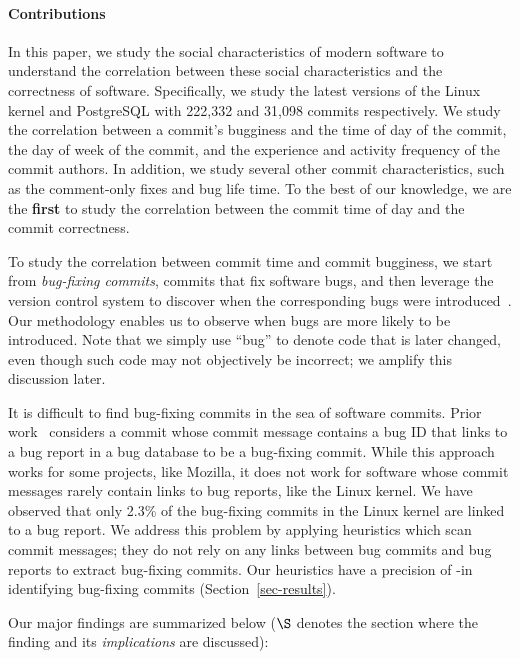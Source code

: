 \paragraph{Contributions}
In this paper, we study the social characteristics of modern software to understand 
the correlation between these social characteristics and the correctness of software.  
Specifically, we study the latest versions of the Linux kernel and PostgreSQL with 222,332 and 31,098 commits respectively.
We study the correlation between a commit's bugginess
and the time of day of the commit, the day of week of the commit, and
the experience and activity frequency of the commit authors.
%
In addition, we study several other commit characteristics, such as
the comment-only fixes and bug life time. 
%
To the best of our
knowledge, we are the {\bf first} to study the correlation between the commit time of day and
the commit correctness. 

To study the correlation between commit time and commit bugginess, we
start from {\em bug-fixing commits}, commits that fix software bugs,
and then leverage the version control system to discover when the
corresponding bugs were introduced~\cite{sliwerski-msr-2005}.  Our
methodology enables us to observe when bugs are more likely to be
introduced.  Note that we simply use ``bug'' to denote code
that is later changed, even though such code may not objectively be
incorrect; we amplify this discussion later.

It is difficult to find bug-fixing commits in the sea of software commits.
Prior work~\cite{sliwerski-msr-2005} considers a commit whose commit message contains a bug 
ID that links to a bug report in a bug database to be a bug-fixing commit. While this
approach works for some projects, like Mozilla, it does not work for software whose commit messages
rarely contain links to bug reports, like the Linux kernel.
We have observed that only 2.3\% of the bug-fixing commits in the Linux kernel are linked to a bug report.
We address this problem by applying heuristics 
which scan commit messages; they do not rely on any links between bug commits and bug reports to extract bug-fixing commits.
Our heuristics have a precision of \postP-\linuxP in identifying bug-fixing commits (Section~\ref{sec-results}).

Our major findings are summarized below ($\S$ denotes the section where the finding and its {\em implications} are discussed):

